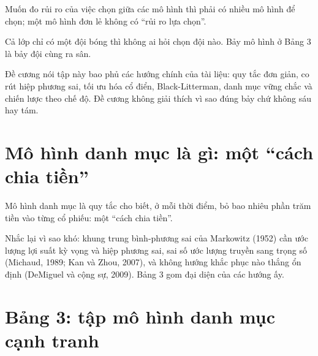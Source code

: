 Muốn đo rủi ro của việc chọn giữa các mô hình thì phải có nhiều mô hình để chọn; một mô hình đơn lẻ không có “rủi ro lựa chọn”.

Cả lớp chỉ có một đội bóng thì không ai hỏi chọn đội nào. Bảy mô hình ở Bảng 3 là bảy đội cùng ra sân.

Đề cương nói tập này bao phủ các hướng chính của tài liệu: quy tắc đơn giản, co rút hiệp phương sai, tối ưu hóa cổ điển, Black-Litterman, danh mục vững chắc và chiến lược theo chế độ. Đề cương không giải thích vì sao đúng bảy chứ không sáu hay tám.

\section{Mô hình danh mục là gì: một “cách chia tiền”}

Mô hình danh mục là quy tắc cho biết, ở mỗi thời điểm, bỏ bao nhiêu phần trăm tiền vào từng cổ phiếu: một “cách chia tiền”.

Nhắc lại vì sao khó: khung trung bình-phương sai của Markowitz (1952) cần ước lượng lợi suất kỳ vọng và hiệp phương sai, sai số ước lượng truyền sang trọng số (Michaud, 1989; Kan và Zhou, 2007), và không hướng khắc phục nào thắng ổn định (DeMiguel và cộng sự, 2009). Bảng 3 gom đại diện của các hướng ấy.

\section{Bảng 3: tập mô hình danh mục cạnh tranh}

